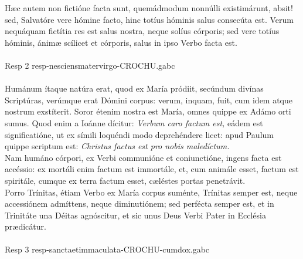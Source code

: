 \documentclass[options]{article}
\begin{document}
Hæc autem non fictióne facta sunt, quemádmodum nonnúlli existimárunt, absit! sed, Salvatóre vere hómine facto, hinc totíus hóminis salus consecúta est. Verum nequáquam fictítia res est salus nostra, neque solíus córporis; sed vere totíus hóminis, ánimæ scílicet et córporis, salus in ipso Verbo facta est.\\
\\
Resp 2 resp-nesciensmatervirgo-CROCHU.gabc
\\
\\
Humánum ítaque natúra erat, quod ex María pródiit, secúndum divínas Scriptúras, verúmque erat Dómini corpus: verum, inquam, fuit, cum idem atque nostrum exstíterit. Soror étenim nostra est María, omnes quippe ex Adámo orti sumus. Quod enim a Ioánne dícitur: \emph{Verbum caro factum est,} eádem est significatióne, ut ex símili loquéndi modo deprehéndere licet: apud Paulum quippe scriptum est: \emph{Christus factus est pro nobis maledíctum.}\\
 Nam humáno córpori, ex Verbi communióne et coniunctióne, ingens facta est accéssio: ex mortáli enim factum est immortále, et, cum animále esset, factum est spiritále, cumque ex terra factum esset, cæléstes portas penetrávit.\\
Porro Trínitas, étiam Verbo ex María corpus suménte, Trínitas semper est, neque accessiónem admíttens, neque diminutiónem; sed perfécta semper est, et in Trinitáte una Déitas agnóscitur, et sic unus Deus Verbi Pater in Ecclésia prædicátur.\\
\\
Resp 3 resp-sanctaetimmaculata-CROCHU-cumdox.gabc
\end{document}
